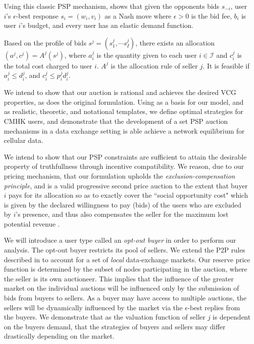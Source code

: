 \documentclass[12pt]{article}
\theoremstyle{definition}
\newcommand{\mcI}{\mathcal{I}}
\begin{document}
\begin{multicols}{2}
Using this classic PSP mechanism, \cite{lazar} shows that given the opponents
bids $s_{-i}$,
user $i$'s $\epsilon$-best response $s_i = (w_i, v_i)$ as a Nash move
where $\epsilon > 0$ is the bid fee, $b_i$ is user $i$'s budget, and every user
has an elastic demand function.

Based on the profile of bids $s^j = (s^j_1, \cdots s^j_I)$, there exists
an allocation $(a^j, c^j) = A^j(s^j)$, where $a^j_i$ is the quantity given to
each user $i\in\mcI$ and $c^j_i$ is the total cost charged to user $i$. $A^j$ is the
allocation rule of seller $j$. It is feasible if $a^j_i \le d_i^j$, and $c^j_i \le  p^j_i d_i^j$.



We intend to show that our auction
is rational and achieves the desired VCG properties, as does the original
formulation. Using \cite{zheng} as a basis for our model, and \cite{lazar} as
realistic, theoretic, and notational templates, we define optimal strategies for
CMHK users, and demonstrate that the development of a set PSP auction mechanisms
in a data exchange setting is able achieve a network equilibrium for cellular data. 


We intend to show that our PSP constraints are
sufficient to attain the desirable property of truthfullness through incentive compatibility. We
reason, due to our pricing mechanism, that our formulation upholds the \emph{exclusion-compensation
principle}, and is a valid progressive second price auction to the extent that buyer $i$
pays for its allocation so as to exactly cover the ``social opportunity cost"
which is given by the declared willingness to pay (bids) of the users who are
excluded by $i$'s presence, and thus also compensates the seller for the maximum lost potential
revenue \cite{lazar}.

We will introduce a user type called an \emph{opt-out buyer} in order to perform our analysis. The
opt-out buyer restricts its pool of sellers. We extend the P2P rules described
in \cite{semret} to account for a set of \emph{local} data-exchange markets.
Our reserve price function is determined by the subset of nodes participating in the
auction, where the seller is its own auctioneer. This implies that the influence of the greater market on the individual
auctions will be influenced only by the submission of bids from buyers to
sellers. As a buyer may have access to multiple auctions, the sellers will be
dynamically influenced by the market via the $\epsilon$-best replies from the
buyers. We demonstrate that as the valuation function of seller $j$ is dependent
on the buyers demand, that the strategies of buyers and sellers may differ
drastically depending on the market.


\end{multicols}
\end{document}
